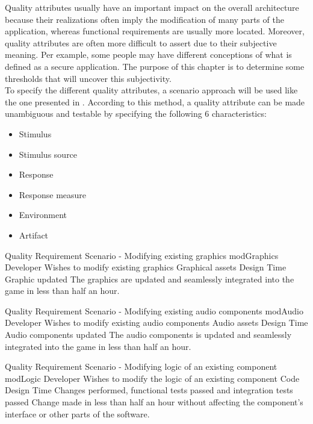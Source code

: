 
Quality attributes usually have an important impact on the overall architecture because their realizations often imply the modification of many parts of the application, whereas functional requirements are usually more located. Moreover, quality attributes are often more difficult to assert due to their subjective meaning. Per example, some people may have different conceptions of what is defined as a secure application. The purpose of this chapter is to determine some thresholds that will uncover this subjectivity. \\

To specify the different quality attributes, a scenario approach will be used like the one presented in \cite[Chapter 4, p.68-69]{bass2013}. According to this method, a quality attribute can be made unambiguous and testable by specifying the following 6 characteristics:
\begin{itemize}
  \item Stimulus
  \item Stimulus source
  \item Response
  \item Response measure
  \item Environment
  \item Artifact
\end{itemize}


{Quality Requirement Scenario - Modifying existing graphics}
{modGraphics}
{Developer}
{Wishes to modify existing graphics}
{Graphical assets}
{Design Time}
{Graphic updated}
{The graphics are updated and seamlessly integrated into the game in less than half an hour.}

{Quality Requirement Scenario - Modifying existing audio components}
{modAudio}
{Developer}
{Wishes to modify existing audio components}
{Audio assets}
{Design Time}
{Audio components updated}
{The audio components is updated and seamlessly integrated into the game in less than half an hour.}

{Quality Requirement Scenario - Modifying logic of an existing component}
{modLogic}
{Developer}
{Wishes to modify the logic of an existing component}
{Code}
{Design Time}
{Changes performed, functional tests passed and integration tests passed}
{Change made in less than half an hour without affecting the component’s interface or other parts of the software.}

